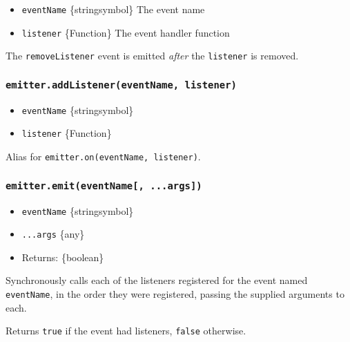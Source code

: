 \begin{itemize}
\tightlist
\item
  \texttt{eventName} \{string\textbar symbol\} The event name
\item
  \texttt{listener} \{Function\} The event handler function
\end{itemize}

The \texttt{\textquotesingle{}removeListener\textquotesingle{}} event is
emitted \emph{after} the \texttt{listener} is removed.

\subsubsection{\texorpdfstring{\texttt{emitter.addListener(eventName,\ listener)}}{emitter.addListener(eventName, listener)}}\label{emitter.addlistenereventname-listener}

\begin{itemize}
\tightlist
\item
  \texttt{eventName} \{string\textbar symbol\}
\item
  \texttt{listener} \{Function\}
\end{itemize}

Alias for \texttt{emitter.on(eventName,\ listener)}.

\subsubsection{\texorpdfstring{\texttt{emitter.emit(eventName{[},\ ...args{]})}}{emitter.emit(eventName{[}, ...args{]})}}\label{emitter.emiteventname-...args}

\begin{itemize}
\tightlist
\item
  \texttt{eventName} \{string\textbar symbol\}
\item
  \texttt{...args} \{any\}
\item
  Returns: \{boolean\}
\end{itemize}

Synchronously calls each of the listeners registered for the event named
\texttt{eventName}, in the order they were registered, passing the
supplied arguments to each.

Returns \texttt{true} if the event had listeners, \texttt{false}
otherwise.

